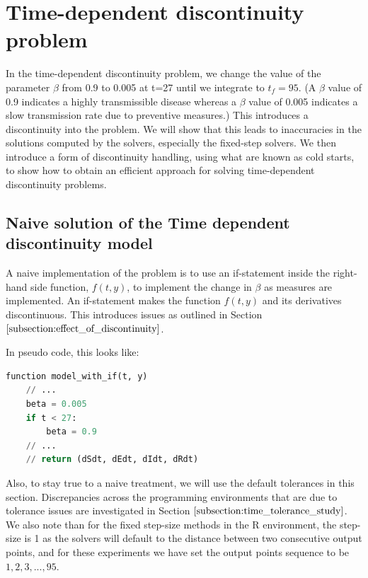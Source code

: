 \section{Time-dependent discontinuity problem}
\label{section:time_problem}
In the time-dependent discontinuity problem, we change the value of the parameter $\beta$ from 0.9 to 0.005 at t=27 until we integrate to $t_f=95$. (A $\beta$ value of 0.9 indicates a highly transmissible disease whereas a $\beta$ value of 0.005 indicates a slow transmission rate due to preventive measures.) This introduces a discontinuity into the problem. We will show that this leads to inaccuracies in the solutions computed by the solvers, especially the fixed-step solvers. We then introduce a form of discontinuity handling, using what are known as cold starts, to show how to obtain an efficient approach for solving time-dependent discontinuity problems.

\subsection{Naive solution of the Time dependent discontinuity model}
\label{subsection:naive_time_problem}
A naive implementation of the problem is to use an if-statement inside the right-hand side function, $f(t, y)$, to implement the change in $\beta$ as measures are implemented. An if-statement makes the function $f(t, y)$ and its derivatives discontinuous. This introduces issues as outlined in Section $\ref{subsection:effect_of_discontinuity}$.

In pseudo code, this looks like:

\begin{minipage}{\linewidth}
\begin{lstlisting}[language=Python]
function model_with_if(t, y)
    // ...
    beta = 0.005
    if t < 27:
        beta = 0.9
    // ...
    // return (dSdt, dEdt, dIdt, dRdt)
\end{lstlisting}
\end{minipage}

Also, to stay true to a naive treatment, we will use the default tolerances in this section. Discrepancies across the programming environments that are due to tolerance issues are investigated in Section $\ref{subsection:time_tolerance_study}$. We also note than for the fixed step-size methods in the R environment, the step-size is 1 as the solvers will default to the distance between two consecutive output points, and for these experiments we have set the output points sequence to be $1, 2, 3, ..., 95$.

